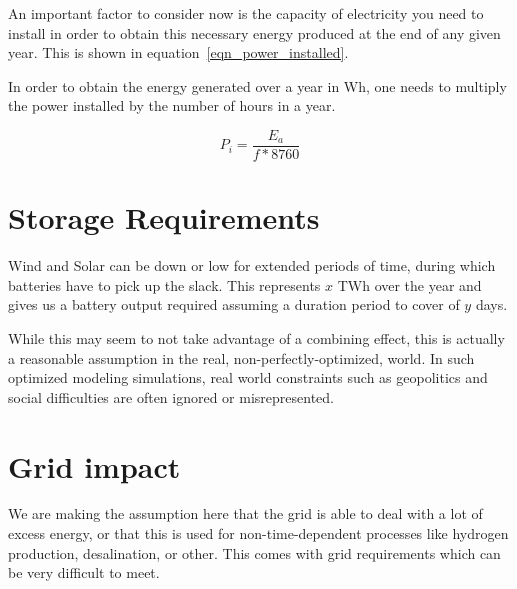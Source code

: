 An important factor to consider now is the capacity of electricity you need to install in order to obtain this necessary energy produced at the end of any given year. This is shown in equation~\ref{eqn_power_installed}.

\begin{remark}
In order to obtain the energy generated over a year in Wh, one needs to multiply the power installed by the number of hours in a year.

\begin{equation}\label{eqn_power_installed}
P_i = \frac{E_a}{f * 8760}
\end{equation}

\end{remark}

\section{Storage Requirements}



\begin{kaobox}[frametitle=What we have said]
Wind and Solar can be down or low for extended periods of time, during which batteries have to pick up the slack. This represents $x$ TWh over the year and gives us a battery output required assuming a duration period to cover of $y$ days.

While this may seem to not take advantage of a combining effect, this is actually a reasonable assumption in the real, non-perfectly-optimized, world. In such optimized modeling simulations, real world constraints such as geopolitics and social difficulties are often ignored or misrepresented.

\end{kaobox}







\section{Grid impact}

We are making the assumption here that the grid is able to deal with a lot of excess energy, or that this is used for non-time-dependent processes like hydrogen production, desalination, or other. This comes with grid requirements which can be very difficult to meet.

